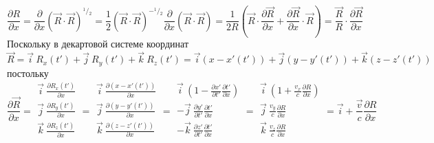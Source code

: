 \documentclass[11pt]{article}
\begin{document}
\[\frac{\partial R}{\partial x}=\frac{\partial }{\partial x}{{\left( \overrightarrow{R}\cdot \overrightarrow{R} \right)}^{{}^{1}/{}_{2}}}=\frac{1}{2}{{\left( \overrightarrow{R}\cdot \overrightarrow{R} \right)}^{-{}^{1}/{}_{2}}}\frac{\partial }{\partial x}\left( \overrightarrow{R}\cdot \overrightarrow{R} \right)=\frac{1}{2R}\left( \overrightarrow{R}\cdot \frac{\partial \overrightarrow{R}}{\partial x}+\frac{\partial \overrightarrow{R}}{\partial x}\cdot \overrightarrow{R} \right)=\frac{\overrightarrow{R}}{R}\cdot \frac{\partial \overrightarrow{R}}{\partial x}\]
Поскольку в декартовой системе координат
\[\overrightarrow{R}=\overrightarrow{i}\ {{R}_{x}}\left( t' \right)+\overrightarrow{j}\ {{R}_{y}}\left( t' \right)+\overrightarrow{k}\ {{R}_{z}}\left( t' \right)=\overrightarrow{i}\left( x-x'\left( t' \right) \right)+\overrightarrow{j}\left( y-y'\left( t' \right) \right)+\overrightarrow{k}\left( z-z'\left( t' \right) \right)\]
постольку
\[\frac{\partial \overrightarrow{R}}{\partial x}=\begin{matrix}
   \overrightarrow{i}\ \frac{\partial {{R}_{x}}\left( t' \right)}{\partial x}  \\
   \overrightarrow{j}\ \frac{\partial {{R}_{y}}\left( t' \right)}{\partial x}  \\
   \overrightarrow{k}\ \frac{\partial {{R}_{z}}\left( t' \right)}{\partial x}  \\
\end{matrix}=\begin{matrix}
   \overrightarrow{i}\ \frac{\partial \left( x-x'\left( t' \right) \right)}{\partial x}  \\
   \overrightarrow{j}\ \frac{\partial \left( y-y'\left( t' \right) \right)}{\partial x}  \\
   \overrightarrow{k}\ \frac{\partial \left( z-z'\left( t' \right) \right)}{\partial x}  \\
\end{matrix}=\begin{matrix}
   \overrightarrow{i}\ \left( 1-\frac{\partial x'}{\partial t'}\frac{\partial t'}{\partial x} \right)  \\
   -\overrightarrow{j}\ \frac{\partial y'}{\partial t'}\frac{\partial t'}{\partial x}  \\
   -\overrightarrow{k}\ \frac{\partial z'}{\partial t'}\frac{\partial t'}{\partial x}  \\
\end{matrix}=\begin{matrix}
   \overrightarrow{i}\ \left( 1+\frac{{{v}_{x}}}{c}\frac{\partial R}{\partial x} \right)  \\
   \overrightarrow{j}\ \frac{{{v}_{y}}}{c}\frac{\partial R}{\partial x}  \\
   \overrightarrow{k}\ \frac{{{v}_{z}}}{c}\frac{\partial R}{\partial x}  \\
\end{matrix}=\overrightarrow{i}+\frac{\overrightarrow{v}}{c}\frac{\partial R}{\partial x}\]
\end{document}
